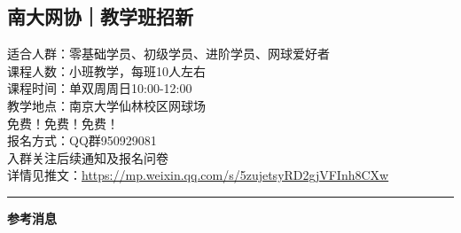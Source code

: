 \documentclass[letterpaper, 12pt]{article}
\begin{document}
\begin{multicols}{2}
\section{南大网协｜教学班招新}
适合人群：零基础学员、初级学员、进阶学员、网球爱好者\\
课程人数：小班教学，每班10人左右\\
课程时间：单双周周日10:00-12:00\\
教学地点：南京大学仙林校区网球场\\
免费！免费！免费！\\
报名方式：QQ群950929081\\
入群关注后续通知及报名问卷\\
详情见推文：\url{https://mp.weixin.qq.com/s/5zujetsyRD2gjVFInh8CXw}\\
\end{multicols} 
\hrule
\vspace{4mm}
\centerline{\huge\textbf{参考消息}}
\end{document}
